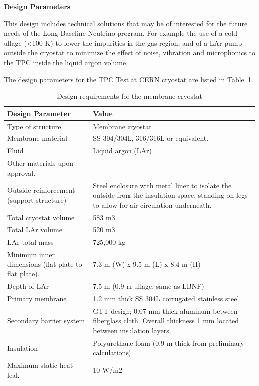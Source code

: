 \textbf{Design Parameters}

This design includes technical solutions that may be of interested for the future needs of the Long Baseline Neutrino program. For example the use of a cold ullage (\textless  100 K) to lower the impurities in the gas region, and of a LAr pump outside the cryostat to minimize the effect of noise, vibration and microphonics to the TPC inside the liquid argon volume.

The design parameters for the TPC Test at CERN cryostat are listed in Table~\ref{tbl:cryogenics-design-parameters}.

\begin{table}[htpb]
\caption{Design requirements for the membrane cryostat}
\label{tbl:cryogenics-design-parameters}
\centering
\begin{tabular}{|p{}|p{}|}
\hline
\textbf{Design Parameter} & \textbf{Value} \\ \hline
Type of structure & Membrane cryostat \\ \hline
Membrane material    &  SS 304/304L, 316/316L or equivalent. \\ \hline
Fluid & Liquid argon (LAr)  \\ \hline
Other materials upon approval.\\ \hline
 Outside reinforcement (support structure)  &  Steel enclosure with metal liner to isolate the outside from the insulation space, standing on legs to allow for air circulation underneath. \\ \hline
 Total cryostat volume  &  583 m3 \\ \hline
 Total LAr volume  &  520 m3 \\ \hline
LAr total mass   & 725,000 kg  \\ \hline
Minimum inner dimensions (flat plate to flat plate).   &  7.3 m (W) x 9.5 m (L) x 8.4 m (H) \\ \hline
Depth of LAr   &  7.5 m (0.9 m ullage, same as LBNF) \\ \hline
Primary membrane   &   1.2 mm thick SS 304L corrugated stainless steel\\ \hline
Secondary barrier system   &  GTT design; 0.07 mm thick aluminum between fiberglass cloth. Overall thickness 1 mm located between insulation layers.  \\ \hline
 Insulation  &  Polyurethane foam (0.9 m thick from preliminary calculations) \\ \hline
Maximum static heat leak   &  10 W/m2 \\ \hline

\end{tabular}
\end{table}
